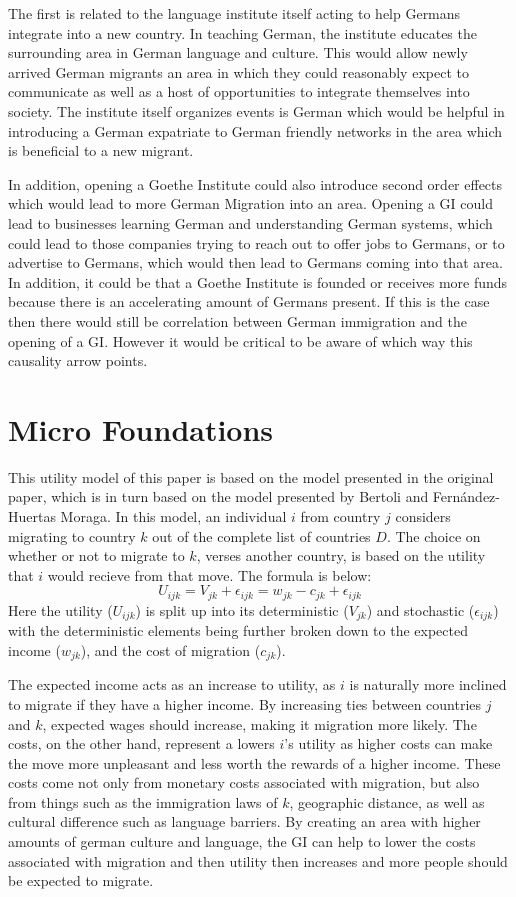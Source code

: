 \documentclass[]{article}
\begin{document}
The first is related to the language institute itself acting to help
Germans integrate into a new country. In teaching German, the institute
educates the surrounding area in German language and culture. This would
allow newly arrived German migrants an area in which they could
reasonably expect to communicate as well as a host of opportunities to
integrate themselves into society. The institute itself organizes events
is German which would be helpful in introducing a German expatriate to
German friendly networks in the area which is beneficial to a new
migrant.

In addition, opening a Goethe Institute could also introduce second
order effects which would lead to more German Migration into an area.
Opening a GI could lead to businesses learning German and understanding
German systems, which could lead to those companies trying to reach out
to offer jobs to Germans, or to advertise to Germans, which would then
lead to Germans coming into that area. In addition, it could be that a
Goethe Institute is founded or receives more funds because there is an
accelerating amount of Germans present. If this is the case then there
would still be correlation between German immigration and the opening of
a GI. However it would be critical to be aware of which way this
causality arrow points.

\section{Micro Foundations}\label{micro-foundations}

This utility model of this paper is based on the model presented in the
original paper, which is in turn based on the model presented by Bertoli
and Fernández-Huertas Moraga. In this model, an individual \(i\) from
country \(j\) considers migrating to country \(k\) out of the complete
list of countries \(D\). The choice on whether or not to migrate to
\(k\), verses another country, is based on the utility that \(i\) would
recieve from that move. The formula is below:
\[ U_{ijk} = V_{jk} + \epsilon_{ijk} = w_{jk} - c_{jk} + \epsilon_{ijk}\]
Here the utility (\(U_{ijk}\)) is split up into its deterministic
(\(V_{jk}\)) and stochastic (\(\epsilon_{ijk}\)) with the deterministic
elements being further broken down to the expected income (\(w_{jk}\)),
and the cost of migration (\(c_{jk}\)).

The expected income acts as an increase to utility, as \(i\) is
naturally more inclined to migrate if they have a higher income. By
increasing ties between countries \(j\) and \(k\), expected wages should
increase, making it migration more likely. The costs, on the other hand,
represent a lowers \(i\)'s utility as higher costs can make the move
more unpleasant and less worth the rewards of a higher income. These
costs come not only from monetary costs associated with migration, but
also from things such as the immigration laws of \(k\), geographic
distance, as well as cultural difference such as language barriers. By
creating an area with higher amounts of german culture and language, the
GI can help to lower the costs associated with migration and then
utility then increases and more people should be expected to migrate.
\end{document}
